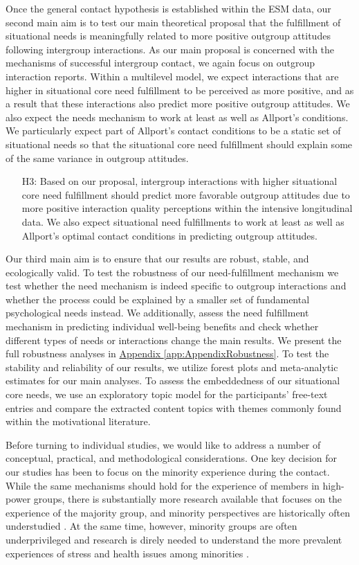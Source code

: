 \documentclass[man, 12pt, a4paper, mask]{apa7}
\theoremstyle{break}
\theoremstyle{plain}
\newcommand{\appref}[2][]{\hyperref[#2]{Appendix \ref*{#2}#1}}
\begin{document}
Once the general contact hypothesis is established within the ESM data, our second main aim is to test our main theoretical proposal that the fulfillment of situational needs is meaningfully related to more positive outgroup attitudes following intergroup interactions. As our main proposal is concerned with the mechanisms of successful intergroup contact, we again focus on outgroup interaction reports. Within a multilevel model, we expect interactions that are higher in situational core need fulfillment to be perceived as more positive, and as a result that these interactions also predict more positive outgroup attitudes. We also expect the needs mechanism to work at least as well as Allport's conditions. We particularly expect part of Allport's contact conditions to be a static set of situational needs so that the situational core need fulfillment should explain some of the same variance in outgroup attitudes.
\begin{enumerate}[leftmargin=1.5\parindent]
    \item[H3:] Based on our proposal, intergroup interactions with higher situational core need fulfillment should predict more favorable outgroup attitudes due to more positive interaction quality perceptions within the intensive longitudinal data. We also expect situational need fulfillments to work at least as well as Allport's optimal contact conditions in predicting outgroup attitudes.
\end{enumerate}

Our third main aim is to ensure that our results are robust, stable, and ecologically valid. To test the robustness of our need-fulfillment mechanism we test whether the need mechanism is indeed specific to outgroup interactions and whether the process could be explained by a smaller set of fundamental psychological needs instead. We additionally, assess the need fulfillment mechanism in predicting individual well-being benefits and check whether different types of needs or interactions change the main results. We present the full robustness analyses in \appref{app:AppendixRobustness}. To test the stability and reliability of our results, we utilize forest plots and meta-analytic estimates for our main analyses. To assess the embeddedness of our situational core needs, we use an exploratory topic model for the participants' free-text entries and compare the extracted content topics with themes commonly found within the motivational literature.

Before turning to individual studies, we would like to address a number of conceptual, practical, and methodological considerations. One key decision for our studies has been to focus on the minority experience during the contact. While the same mechanisms should hold for the experience of members in high-power groups, there is substantially more research available that focuses on the experience of the majority group, and minority perspectives are historically often understudied \citep[e.g.,][]{Dovidio2017}. At the same time, however, minority groups are often underprivileged and research is direly needed to understand the more prevalent experiences of stress and health issues among minorities \citep[e.g.,][]{alvidrez2019}. 
\end{document}
